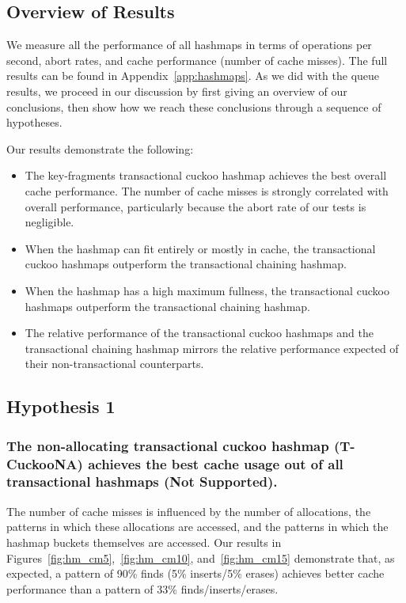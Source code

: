 \subsection{Overview of Results}

We measure all the performance of all hashmaps in terms of operations per second, abort rates, and cache performance (number of cache misses). 
The full results can be found in Appendix~\ref{app:hashmaps}. As we did with the queue results, we proceed in our discussion by first giving an overview of our conclusions, then show how we reach these conclusions through a sequence of hypotheses.

Our results demonstrate the following:
\begin{itemize}
    \item The key-fragments transactional cuckoo hashmap achieves the best overall cache performance. The number of cache misses is strongly correlated with overall performance, particularly because the abort rate of our tests is negligible.
    \item When the hashmap can fit entirely or mostly in cache, the transactional cuckoo hashmaps outperform the transactional chaining hashmap.
    \item When the hashmap has a high maximum fullness, the transactional cuckoo hashmaps outperform the transactional chaining hashmap.
    \item The relative performance of the transactional cuckoo hashmaps and the transactional chaining hashmap mirrors the relative performance expected of their non-transactional counterparts.
\end{itemize}

\subsection{Hypothesis 1}
\subsubsection{The non-allocating transactional cuckoo hashmap (T-CuckooNA) achieves the best cache usage out of all transactional hashmaps (Not Supported).}
\label{section:hmcm}

The number of cache misses is influenced by the number of allocations, the patterns in which these allocations are accessed, and the patterns in which the hashmap buckets themselves are accessed. Our results in Figures~\ref{fig:hm_cm5},~\ref{fig:hm_cm10}, and~\ref{fig:hm_cm15} demonstrate that, as expected, a pattern of 90\% finds (5\% inserts/5\% erases) achieves better cache performance than a pattern of 33\% finds/inserts/erases.

